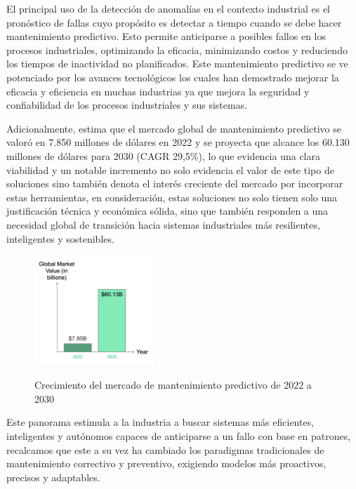 \documentclass[11pt,a4paper,spanish]{book}
\numberwithin{equation}{chapter}
\numberwithin{figure}{chapter}
\begin{document}
El principal uso de la detección de anomalías en el contexto industrial es el pronóstico 
de fallas cuyo propósito es detectar a tiempo cuando se debe hacer mantenimiento 
predictivo. Esto permite anticiparse a posibles fallos en los procesos industriales, 
optimizando la eficacia, minimizando costos y reduciendo los tiempos de inactividad no 
planificados. Este mantenimiento predictivo se ve potenciado por los avances tecnológicos 
los cuales han demostrado mejorar la eficacia y eficiencia en muchas industrias ya que 
mejora la seguridad y confiabilidad de los procesos industriales y sus sistemas.


Adicionalmente, \cite{worktrek2023predictive} estima que el mercado global de 
mantenimiento predictivo se valoró en 7.850 millones de dólares en 2022 y se proyecta 
que alcance los 60.130 millones de dólares para 2030 (CAGR 29,5\%), lo que evidencia 
una clara viabilidad y un notable incremento no solo evidencia el valor de este tipo de 
soluciones sino también denota el interés creciente del mercado por incorporar estas 
herramientas, en consideración, estas soluciones no solo tienen solo una  justificación 
técnica y económica sólida, sino que también responden a una necesidad global de 
transición hacia sistemas industriales más resilientes, inteligentes y sostenibles.


\begin{figure}[h]
    \caption{Crecimiento del mercado de mantenimiento predictivo de 2022 a 2030  
    \protect\cite{worktrek2023predictive}}
    \centering
    \includegraphics[width=0.4\textwidth]{media/worktrek.png}
    \label{fig:figWorkTrek}
\end{figure}


Este panorama estimula a la industria a buscar sistemas más eficientes, inteligentes y 
autónomos capaces de anticiparse a un fallo con base en patrones, recalcamos que este a 
su vez ha cambiado los paradigmas tradicionales de mantenimiento correctivo y preventivo,
exigiendo modelos más proactivos, precisos y adaptables.
\end{document}
